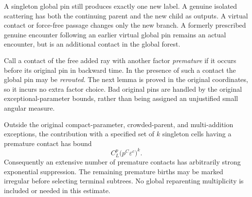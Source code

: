 A singleton global pin still produces exactly one new label.  A genuine
isolated scattering has both the continuing parent and the new child as
outputs.  A virtual contact or force-free passage changes only the new
branch.  A formerly prescribed genuine encounter following an earlier
virtual global pin remains an actual encounter, but is an additional
contact in the global forest.

Call a contact of the free added ray with another factor \emph{premature}
if it occurs before its original pin in backward time.  In the presence of
such a contact the global pin may be \emph{rerouted}.  The next lemma is
proved in the original coordinates, so it incurs no extra factor choice.
Bad original pins are handled by the original exceptional-parameter
bounds, rather than being assigned an unjustified small angular measure.

\begin{lemma}
\label{exp:rerouting}
Outside the original compact-parameter, crowded-parent, and multi-addition
exceptions, the contribution with a specified set of $k$ singleton cells
having a premature contact has bound
\begin{equation}
\label{exp:reroute-bound}
 C_L^p\bigl(p^C\varepsilon^c\bigr)^k.
\end{equation}
Consequently an extensive number of premature contacts has arbitrarily
strong exponential suppression.  The remaining premature births may be
marked irregular before selecting terminal subtrees.  No global
reparenting multiplicity is included or needed in this estimate.
\end{lemma}

